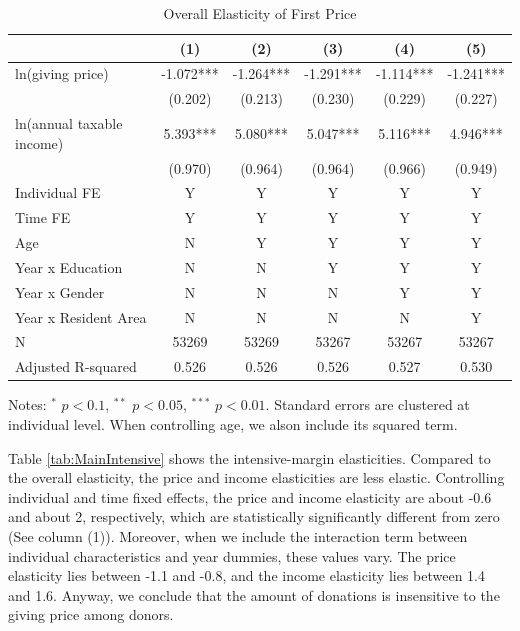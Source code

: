 \documentclass[
  11pt,
  a4paper,
]{article}
\begin{document}
\begin{table}

\caption{\label{tab:MainOverall}Overall Elasticity of First Price}
\centering
\fontsize{9}{11}\selectfont
\begin{threeparttable}
\begin{tabular}[t]{lccccc}
\toprule
 & (1) & (2) & (3) & (4) & (5)\\
\midrule
ln(giving price) & -1.072*** & -1.264*** & -1.291*** & -1.114*** & -1.241***\\
 & (0.202) & (0.213) & (0.230) & (0.229) & (0.227)\\
ln(annual taxable income) & 5.393*** & 5.080*** & 5.047*** & 5.116*** & 4.946***\\
 & (0.970) & (0.964) & (0.964) & (0.966) & (0.949)\\
Individual FE & Y & Y & Y & Y & Y\\
Time FE & Y & Y & Y & Y & Y\\
Age & N & Y & Y & Y & Y\\
Year x Education & N & N & Y & Y & Y\\
Year x Gender & N & N & N & Y & Y\\
Year x Resident Area & N & N & N & N & Y\\
N & 53269 & 53269 & 53267 & 53267 & 53267\\
Adjusted R-squared & 0.526 & 0.526 & 0.526 & 0.527 & 0.530\\
\bottomrule
\end{tabular}
\begin{tablenotes}
\item Notes: $^{*}$ $p < 0.1$, $^{**}$ $p < 0.05$, $^{***}$ $p < 0.01$. Standard errors are clustered at individual level. When controlling age, we alson include its squared term.
\end{tablenotes}
\end{threeparttable}
\end{table}

Table \ref{tab:MainIntensive} shows the intensive-margin elasticities.
Compared to the overall elasticity, the price and income elasticities are less elastic.
Controlling individual and time fixed effects,
the price and income elasticity are about -0.6 and about 2, respectively,
which are statistically significantly different from zero (See column (1)).
Moreover, when we include the interaction term between individual characteristics and year dummies,
these values vary.
The price elasticity lies between -1.1 and -0.8,
and the income elasticity lies between 1.4 and 1.6.
Anyway, we conclude that the amount of donations is insensitive to the giving price among donors.
\end{document}
